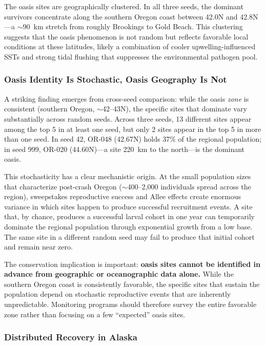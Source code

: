 The oasis sites are geographically clustered.  In all three seeds, the dominant
survivors concentrate along the southern Oregon coast between 42.0\textdegree N
and 42.8\textdegree N---a $\sim$90~km stretch from roughly Brookings to Gold
Beach.  This clustering suggests that the oasis phenomenon is not random but
reflects favorable local conditions at these latitudes, likely a combination
of cooler upwelling-influenced SSTs and strong tidal flushing that suppresses
the environmental pathogen pool.

\subsubsection{Oasis Identity Is Stochastic, Oasis Geography Is Not}

A striking finding emerges from cross-seed comparison: while the oasis
\textit{zone} is consistent (southern Oregon, $\sim$42--43\textdegree N), the
specific sites that dominate vary substantially across random seeds.  Across
three seeds, 13 different sites appear among the top 5 in at least one seed,
but only 2 sites appear in the top 5 in more than one seed.  In seed 42,
OR-048 (42.67\textdegree N) holds 37\% of the regional population; in seed 999,
OR-020 (44.60\textdegree N)---a site 220~km to the north---is the dominant oasis.

This stochasticity has a clear mechanistic origin.  At the small population
sizes that characterize post-crash Oregon ($\sim$400--2{,}000 individuals spread
across the region), sweepstakes reproductive success \citep{hedgecock2011}
and Allee effects create enormous variance in which sites happen to produce
successful recruitment events.  A site that, by chance, produces a successful
larval cohort in one year can temporarily dominate the regional population
through exponential growth from a low base.  The same site in a different
random seed may fail to produce that initial cohort and remain near zero.

The conservation implication is important: \textbf{oasis sites cannot be
identified in advance from geographic or oceanographic data alone.}  While the
southern Oregon coast is consistently favorable, the specific sites that
sustain the population depend on stochastic reproductive events that are
inherently unpredictable.  Monitoring programs should therefore survey the
entire favorable zone rather than focusing on a few ``expected'' oasis sites.

\subsubsection{Distributed Recovery in Alaska}

